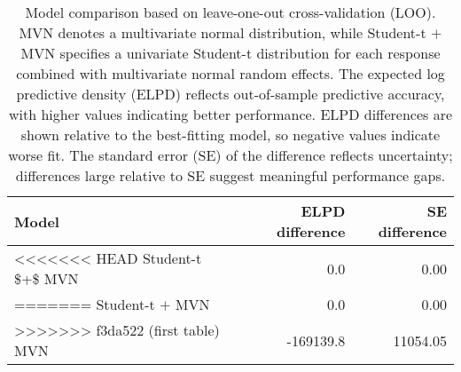 \begin{table}

\caption{Model comparison based on leave-one-out cross-validation (LOO).  MVN denotes a multivariate normal distribution, while Student-t $+$ MVN specifies a univariate Student-t distribution for each response combined with multivariate normal random effects.
  The expected log predictive density (ELPD) reflects out-of-sample predictive accuracy, with higher values indicating better performance. ELPD differences are shown relative to the best-fitting model, so negative values indicate worse fit. The standard error (SE) of the difference reflects uncertainty; differences large relative to SE suggest meaningful performance gaps.}
\centering
\begin{tabular}[t]{lrr}
\toprule
Model & ELPD difference & SE difference\\
\midrule
<<<<<<< HEAD
Student-t \$+\$ MVN & 0.0 & 0.00\\
=======
Student-t $+$ MVN & 0.0 & 0.00\\
>>>>>>> f3da522 (first table)
MVN & -169139.8 & 11054.05\\
\bottomrule
\end{tabular}
\end{table}
